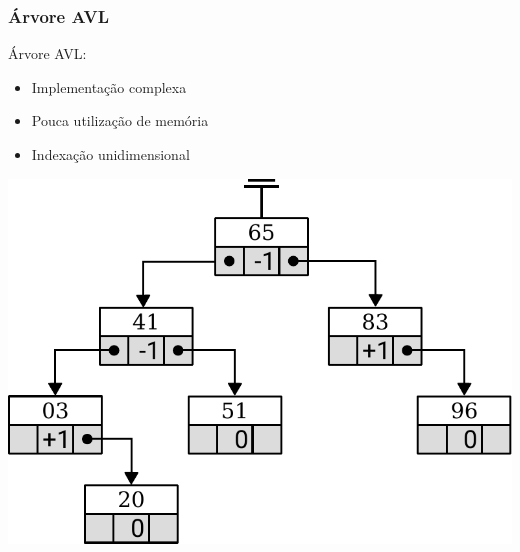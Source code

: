 \documentclass[10pt,xcolor=table,fleqn]{beamer}
\newcommand{\badpt}{{\color{defred} \DOWNarrow }}
\newcommand{\medpt}{{\color{defgray} \CIRCLE }}
\newcommand{\goodpt}{{\color{defgreen} \UParrow }}
\begin{document}
\begin{frame}
  \frametitle{Árvore AVL}
  Árvore AVL:\\
  \vspace{0.8em}
  \begin{itemize}
    \setlength\itemsep{0.8em}
    \item{ Implementação complexa \badpt }
    \item{ Pouca utilização de memória \goodpt }
    \item{ Indexação unidimensional \medpt }
  \end{itemize}
  \pause
  \begin{center}
    \includegraphics[scale=0.4]{../img/kdt/avl-model}
  \end{center}
\end{frame}
\end{document}
